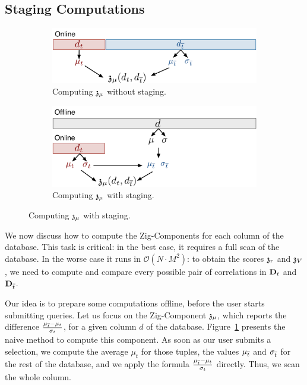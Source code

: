 \subsection{Staging Computations}
\label{sec:optimization}

\begin{figure}[t!]
    \centering
    \begin{subfigure}[b]{0.8\columnwidth}
    \includegraphics[width=\textwidth]{Figures/Staging}
    \caption{Computing $\mathfrak{z}_\mu$ without staging.}
    \label{pic:withoutstag}
    \end{subfigure}

    \begin{subfigure}[b]{.8\columnwidth}
        \includegraphics[width=\textwidth]{Figures/Staging2}
    \caption{Computing  $\mathfrak{z}_\mu$  with staging.}
    \label{pic:withstag}
    \end{subfigure}
\end{figure}

We now discuss how to compute the Zig-Components for each column of the
database. This task is critical: in the best case, it requires a full scan of
the database. In the worse case it runs in $\mathcal{O}(N \cdot M^2)$:  to
obtain the scores $\mathfrak{z}_r$ and $\mathfrak{z}_V$, we need to compute and compare
every possible pair of correlations in $\mathbf{D}_t$ and $\mathbf{D}_{\overline{t}}$.

Our idea is to prepare some computations offline, before the user starts
submitting queries.  Let us focus on the Zig-Component $\mathfrak{z}_\mu$, which
reports the difference $\frac{\mu_{\overline{t}} - \mu_{t}}{\sigma_t}$, for a given
column $d$ of the database.  Figure~\ref{pic:withoutstag} presents the naive
method to compute this component.  As soon as our user submits a selection, we
compute the average $\mu_t$ for those tuples, the values $\mu_{\overline{t}}$ and
$\sigma_{\overline{t}}$ for the rest of the database, and we apply the formula
$\frac{\mu_{\overline{t}} - \mu_{t}}{\sigma_t}$  directly. Thus, we scan the whole
column.

